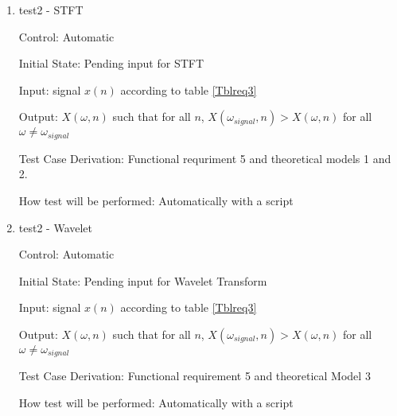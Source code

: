 \documentclass[12pt, titlepage]{article}
\begin{document}
\begin{enumerate}
\item{test2 - STFT\\}

Control: Automatic
					
Initial State: Pending input for STFT
					
Input: signal $x(n)$ according to table \ref{Tblreq3}
					
Output: $X(\omega, n)$ such that for all $n$, $X(\omega_{signal}, n) > X(\omega, n)$ for all $\omega \neq \omega_{signal}$

Test Case Derivation: Functional requriment 5 and theoretical models 1 and 2.
					
How test will be performed: Automatically with a script

\item{test2 - Wavelet\\}

Control: Automatic
					
Initial State: Pending input for Wavelet Transform
					
Input: signal $x(n)$ according to table \ref{Tblreq3}
					
Output:  $X(\omega, n)$ such that for all $n$, $X(\omega_{signal}, n) > X(\omega, n)$ for all $\omega \neq \omega_{signal}$

Test Case Derivation: Functional requirement 5 and theoretical Model 3
					
How test will be performed: Automatically with a script


\end{enumerate}
\end{document}
